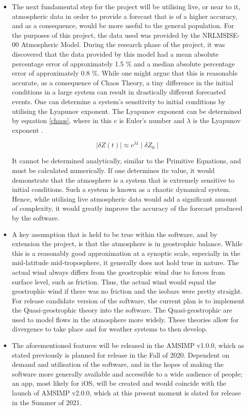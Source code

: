 \begin{itemize}
    \item The next fundamental step for the project will be utilising live, or near to it, atmospheric data in order to provide a forecast that is of a higher accuracy, and as a consequence, would be more useful to the general population. For the purposes of this project, the data used was provided by the NRLMSISE-00 Atmospheric Model. During the research phase of the project, it was discovered that the data provided by this model had a mean absolute percentage error of approximately 1.5 \% and a median absolute percentage error of approximately 0.8 \%. While one might argue that this is reasonable accurate, as a consequence of Chaos Theory, a tiny difference in the initial conditions in a large system can result in drastically different forecasted events. One can determine a system's sensitivity to initial conditions by utilising the Lyapunov exponent. The Lyapunov exponent can be determined by equation \ref{chaos}, where in this $e$ is Euler's number and $\lambda$ is the Lyapunov exponent \cite{lyapunov}.
    
    \begin{equation}
        \label{chaos}
        \mid{\delta Z(t)}\mid \approx e^{\lambda t} \mid{\delta Z_{0}}\mid
    \end{equation}
    
    It cannot be determined analytically, similar to the Primitive Equations, and must be calculated numerically. If one determines its value, it would demonstrate that the atmosphere is a system that is extremely sensitive to initial conditions. Such a system is known as a chaotic dynamical system. Hence, while utilising live atmospheric data would add a significant amount of complexity, it would greatly improve the accuracy of the forecast produced by the software.
    \item A key assumption that is held to be true within the software, and by extension the project, is that the atmosphere is in geostrophic balance. While this is a reasonably good approximation at a synoptic scale, especially in the  mid-latitude mid-troposphere, it generally does not hold true in nature. The actual wind always differs from the geostrophic wind due to forces from surface level, such as friction. Thus, the actual wind would equal the geostrophic wind if there was no friction and the isobars were pretty straight. For release candidate version of the software, the current plan is to implement the Quasi-geostrophic theory into the software. The Quasi-geostrophic are used to model flows in the atmosphere more widely. These theories allow for divergence to take place and for weather systems to then develop\cite{quasi_future}.
    \item The aforementioned features will be released in the AMSIMP v1.0.0, which as stated previously is planned for release in the Fall of 2020. Dependent on demand and utilisation of the software, and in the hopes of making the software more generally available and accessible to a wide audience of people; an app, most likely for iOS, will be created and would coincide with the launch of AMSIMP v2.0.0, which at this present moment is slated for release in the Summer of 2021.
\end{itemize}
